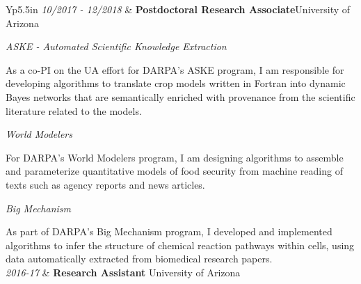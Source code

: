 \documentclass[final,oneside,11pt]{memoir}
\begin{document}
\begin{ctabular}{Yp{5.5in}}
    \emph{10/2017 - 12/2018} & \textsf{\textbf{Postdoctoral Research Associate}}\hfill \textsf{University of Arizona}\newline


      \emph{ASKE - Automated Scientific Knowledge Extraction}\newline

        As a co-PI on the UA effort for DARPA's ASKE program, I am responsible
        for developing algorithms to translate crop models written in Fortran into
        dynamic Bayes networks that are semantically enriched with provenance from the
        scientific literature related to the models.\newline

      \emph{World Modelers}\newline

        For DARPA's World Modelers program, I am designing algorithms to
        assemble and parameterize quantitative models of food security from machine
        reading of texts such as agency reports and news
        articles.\newline

      \emph{Big Mechanism}\newline

        As part of DARPA's Big Mechanism program, I developed and
        implemented algorithms to infer the structure of chemical reaction pathways
        within cells, using data automatically extracted from biomedical research
        papers.
  \\\addlinespace
    \textit{2016-17} & \textsf{\textbf{Research Assistant}}\hfill \textsf{ University of Arizona}\\


\end{ctabular}
\end{document}
